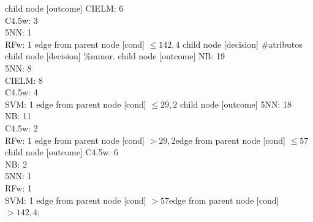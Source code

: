 child {node [outcome] {
CIELM: 6\\
C4.5w: 3\\
5NN: 1\\
RFw: 1} edge from parent node [cond] {$\leq142,4$}}
child {node [decision] {\#atributos}
child {node [decision] {\%minor.}
child {node [outcome] {
NB: 19\\
5NN: 8\\
CIELM: 8\\
C4.5w: 4\\
SVM: 1} edge from parent node [cond] {$\leq29,2$}}
child {node [outcome] {
5NN: 18\\
NB: 11\\
C4.5w: 2\\
RFw: 1} edge from parent node [cond] {$>29,2$}}edge from parent node [cond] {$\leq57$}}
child {node [outcome] {
C4.5w: 6\\
NB: 2\\
5NN: 1\\
RFw: 1\\
SVM: 1} edge from parent node [cond] {$>57$}}edge from parent node [cond] {$>142,4$}};